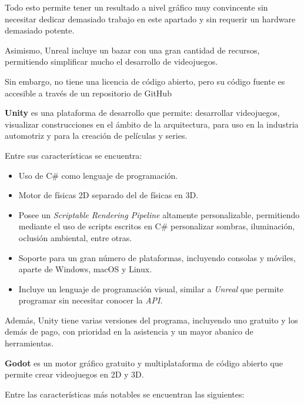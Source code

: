 \documentclass[a4paper,11pt]{book}
\begin{document}
Todo esto permite tener un resultado a nivel gráfico muy convincente sin necesitar dedicar demasiado trabajo en este apartado y sin requerir un hardware demasiado potente.

\bigskip

Asimismo, Unreal incluye un bazar con una gran cantidad de recursos, permitiendo simplificar mucho el desarrollo de videojuegos.

\bigskip

Sin embargo, no tiene una licencia de código abierto, pero su código fuente es accesible a través de un repositorio de GitHub %

\bigskip

\textbf{Unity} es una plataforma de desarrollo que permite: desarrollar videojuegos, visualizar construcciones en el ámbito de la arquitectura, para uso en la industria automotriz y para la creación de películas y series.

\bigskip

Entre sus características se encuentra:

\begin{itemize}
   \item Uso de C\# como lenguaje de programación.
   \item Motor de físicas 2D separado del de físicas en 3D.
   \item Posee un \textit{Scriptable Rendering Pipeline} altamente personalizable, permitiendo mediante el uso de scripts escritos en C\# personalizar sombras, iluminación, oclusión ambiental, entre otras.
   \item Soporte para un gran número de plataformas, incluyendo consolas y móviles, aparte de Windows, macOS y Linux.
   \item Incluye un lenguaje de programación visual, similar a \textit{Unreal} que permite programar sin necesitar conocer la \textit{API}.
\end{itemize}
   
\bigskip

Además, Unity tiene varias versiones del programa, incluyendo uno gratuito y los demás de pago, con prioridad en la asistencia y un mayor abanico de herramientas.

\bigskip

\textbf{Godot} es un motor gráfico gratuito y multiplataforma de código abierto que permite crear videojuegos en 2D y 3D. 
   
Entre las características más notables se encuentran las siguientes:
\end{document}
